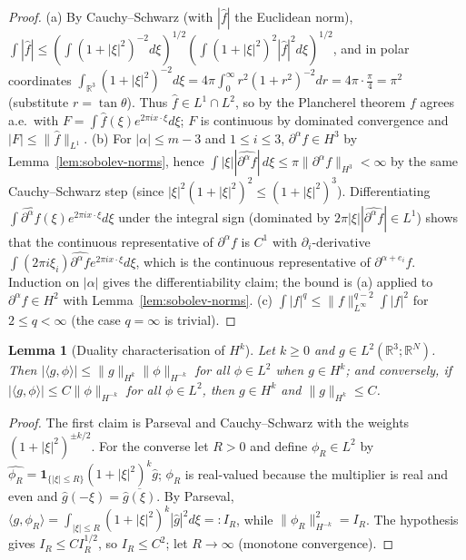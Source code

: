 \documentclass[11pt]{article}
\newtheorem{lemma}[theorem]{Lemma}
\theoremstyle{definition}
\theoremstyle{plain}
\newcommand{\R}{\mathbb R}
\newcommand{\norm}[1]{\lVert #1\rVert}
\begin{document}
\begin{proof}
(a) By Cauchy--Schwarz (with $|\widehat f|$ the Euclidean norm),
$\int|\widehat f|\leq(\int(1+|\xi|^2)^{-2}d\xi)^{1/2}
(\int(1+|\xi|^2)^{2}|\widehat f|^2d\xi)^{1/2}$, and in polar coordinates
$\int_{\R^3}(1+|\xi|^2)^{-2}d\xi=4\pi\int_0^\infty r^2(1+r^2)^{-2}dr
=4\pi\cdot\frac\pi4=\pi^2$ (substitute $r=\tan\theta$).  Thus
$\widehat f\in L^1\cap L^2$, so by the Plancherel theorem $f$ agrees a.e.\
with $F=\int\widehat f(\xi)e^{2\pi ix\cdot\xi}d\xi$; $F$ is continuous by
dominated convergence and $|F|\leq\norm{\widehat f}_{L^1}$.
(b) For $|\alpha|\leq m-3$ and $1\leq i\leq3$, $\partial^\alpha f\in
H^3$ by Lemma~\ref{lem:sobolev-norms}, hence $\int|\xi||\widehat{\partial^\alpha
f}|\,d\xi\leq\pi\norm{\partial^\alpha f}_{H^3}<\infty$ by the same
Cauchy--Schwarz step (since $|\xi|^2(1+|\xi|^2)^2\leq(1+|\xi|^2)^3$).
Differentiating $\int\widehat{\partial^\alpha f}(\xi)e^{2\pi
ix\cdot\xi}d\xi$ under the integral sign (dominated by
$2\pi|\xi||\widehat{\partial^\alpha f}|\in L^1$) shows that the continuous
representative of $\partial^\alpha f$ is $C^1$ with $\partial_i$-derivative
$\int(2\pi i\xi_i)\widehat{\partial^\alpha f}e^{2\pi ix\cdot\xi}d\xi$,
which is the continuous representative of $\partial^{\alpha+e_i}f$.
Induction on $|\alpha|$ gives the differentiability claim; the bound is (a)
applied to $\partial^\alpha f\in H^2$ with
Lemma~\ref{lem:sobolev-norms}.
(c) $\int|f|^q\leq\norm f_{L^\infty}^{q-2}\int|f|^2$ for $2\leq q<\infty$
(the case $q=\infty$ is trivial).
\end{proof}

\begin{lemma}[Duality characterisation of $H^k$]\label{lem:duality}
Let $k\geq0$ and $g\in L^2(\R^3;\R^N)$.  Then $|\langle g,\phi\rangle|
\leq\norm g_{H^k}\norm\phi_{H^{-k}}$ for all $\phi\in L^2$ when
$g\in H^k$; and conversely, if $|\langle g,\phi\rangle|\leq
C\norm\phi_{H^{-k}}$ for all $\phi\in L^2$, then $g\in H^k$ and
$\norm g_{H^k}\leq C$.
\end{lemma}

\begin{proof}
The first claim is Parseval and Cauchy--Schwarz with the weights
$(1+|\xi|^2)^{\pm k/2}$.  For the converse let $R>0$ and define
$\phi_R\in L^2$ by $\widehat{\phi_R}=\mathbf 1_{\{|\xi|\leq R\}}
(1+|\xi|^2)^k\widehat g$; $\phi_R$ is real-valued because the multiplier is
real and even and $\widehat g(-\xi)=\overline{\widehat g(\xi)}$.  By
Parseval, $\langle g,\phi_R\rangle=\int_{|\xi|\leq R}(1+|\xi|^2)^k
|\widehat g|^2d\xi=:I_R$, while $\norm{\phi_R}_{H^{-k}}^2=I_R$.  The
hypothesis gives $I_R\leq CI_R^{1/2}$, so $I_R\leq C^2$; let
$R\to\infty$ (monotone convergence).
\end{proof}
\end{document}
